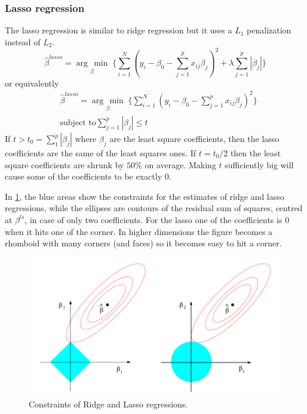 \documentclass[12pt, letterpaper]{article}
\theoremstyle{definition}
\newcommand{\argmin}[1]{\underset{#1}{\operatorname{arg}\,\operatorname{min}}\;}
\begin{document}
\subsubsection{Lasso regression}
The lasso regression is similar to ridge regression but it uses a $L_1$ penalization instead of $L_2$.
\begin{equation}
\label{blasso}
\hat{\beta}^{lasso} = \argmin{\beta} \Bigg\lbrace \sum_{i=1}^N \left( y_i -  \beta_0 - \sum_{j=1}^p x_{ij} \beta_j\right)^2+ \lambda \sum_{j=1}^p |\beta_j| \Bigg\rbrace
\end{equation}
or equivalently
\begin{equation}
\begin{aligned}
&\hat{\beta}^{lasso} = \argmin{\beta} \Bigg\lbrace \sum_{i=1}^N \left( y_i -  \beta_0 - \sum_{j=1}^p x_{ij} \beta_j\right)^2 \Bigg\rbrace\\
&\text{subject to} \sum_{j=1}^p |\beta_j| \le t
\end{aligned}
\end{equation}
If $t>t_0= \sum_1^p |\beta_j|$ where $\beta_j$ are the least square coefficients, then the lasso coefficients are the same of the least squares ones. If $t=t_0/2$ then the least square coefficients are shrunk by $50\%$ on average. Making $t$ sufficiently big will cause some of the coefficients to be exactly $0$.

In \ref{ridge_lasso}, the blue areas show the constraints for the estimates of ridge and lasso regressions, while the ellipses are contours of the residual sum of squares, centred at $\beta^{ls}$, in case of only two coefficients. For the lasso one of the coefficients is $0$ when it hits one of the corner. In higher dimensions the figure becomes a rhomboid with many corners (and faces) so it becomes easy to hit a corner. 
\begin{figure}
\centering
\includegraphics[scale=0.4]{img/ridge_lasso}
\caption{Constraints of Ridge and Lasso regressions.}
\label{ridge_lasso}
\end{figure}
\end{document}
